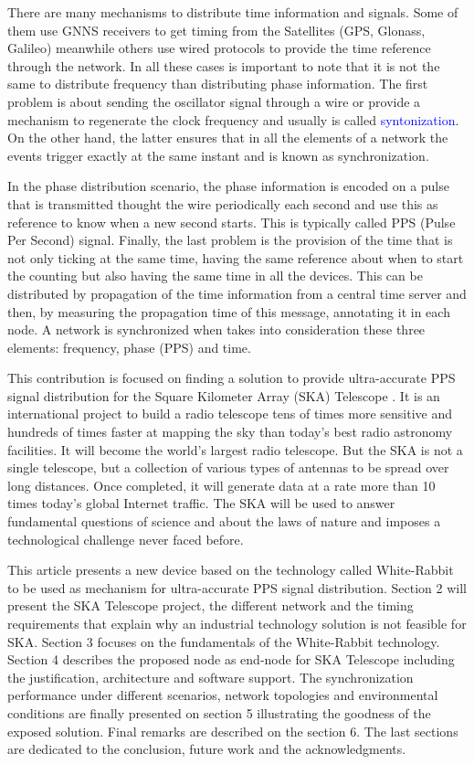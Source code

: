 There are many mechanisms to distribute time information and signals. Some of them use GNNS receivers to get timing from the Satellites (GPS, Glonass, Galileo) meanwhile others use wired protocols to provide the time reference through the network. In all these cases is important to note that it is not the same to distribute frequency than distributing phase information. The first problem is about sending the oscillator signal through a wire or provide a mechanism to regenerate the clock frequency and usually is called \textcolor{blue}{syntonization}. On the other hand, the latter ensures that in all the elements of a network the events trigger exactly at the same instant and is known as synchronization. 

In the phase distribution scenario, the phase information is encoded on a pulse that is transmitted thought the wire periodically each second and use this as reference to know when a new second starts. This is typically called PPS (Pulse Per Second) signal. Finally, the last problem is the provision of the time that is not only ticking at the same time, having the same reference about when to start the counting but also having the same time in all the devices. This can be distributed by propagation of the time information from a central time server and then, by measuring the propagation time of this message, annotating it in each node. A network is synchronized when takes into consideration these three elements: frequency, phase (PPS) and time.

This contribution is focused on finding a solution to provide ultra-accurate PPS signal distribution for the Square Kilometer Array (SKA) Telescope \cite{ska:project_website}. It is an international project to build a radio telescope tens of times more sensitive and hundreds of times faster at mapping the sky than today’s best radio astronomy facilities. It will become the world’s largest radio telescope. But the SKA is not a single telescope, but a collection of various types of antennas to be spread over long distances. Once completed, it will generate data at a rate more than 10 times today’s global Internet traffic. The SKA will be used to answer fundamental questions of science and about the laws of nature and imposes a technological challenge never faced before. 

This article presents a new device based on the technology called White-Rabbit \cite{ohwr:wr_wiki} to be used as mechanism for ultra-accurate PPS signal distribution. Section 2 will present the SKA Telescope project, the different network and the timing requirements that explain why an industrial technology solution is not feasible for SKA. Section 3 focuses on the fundamentals of the White-Rabbit technology. Section 4 describes the proposed node as end-node for SKA Telescope including the justification, architecture and software support. The synchronization performance under different scenarios, network topologies and environmental conditions are finally presented on section 5 illustrating the goodness of the exposed solution. Final remarks are described on the section 6. The last sections are dedicated to the conclusion, future work and the acknowledgments.